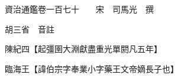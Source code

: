 










 


 
 


 

  
  
  
  
  





  
  
  
  
  
 
  

  

  
  
  



  

 
 

  
   




  

  
  


  　　資治通鑑卷一百七十　　宋　司馬光　撰

　　胡三省　音註

　　陳紀四【起彊圉大淵獻盡重光單閼凡五年】

　　臨海王【諱伯宗字奉業小字藥王文帝嫡長子也】


